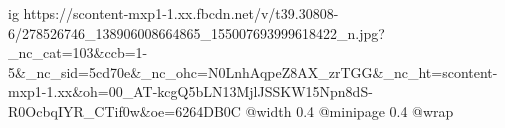  
 
 
 
 

\ifcmt
  ig https://scontent-mxp1-1.xx.fbcdn.net/v/t39.30808-6/278526746_138906008664865_155007693999618422_n.jpg?_nc_cat=103&ccb=1-5&_nc_sid=5cd70e&_nc_ohc=N0LnhAqpeZ8AX_zrTGG&_nc_ht=scontent-mxp1-1.xx&oh=00_AT-kcgQ5bLN13MjlJSSKW15Npn8dS-R0OcbqIYR_CTif0w&oe=6264DB0C
  @width 0.4
  @minipage 0.4
  @wrap \parpic[r]
\fi
